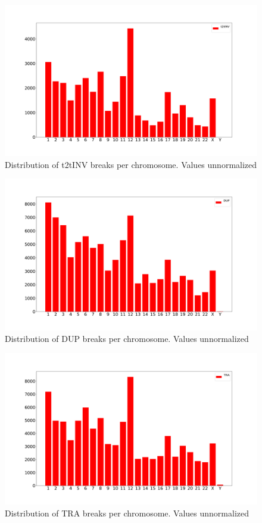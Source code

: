 \documentclass[a4paper,10pt]{article}
\begin{document}
\begin{figure}[H]
\includegraphics[scale=0.2]{figures/t2tINV_Break_distribution_unnormalized.pdf}
\caption{Distribution of t2tINV breaks per chromosome. Values unnormalized}
\end{figure}

\begin{figure}[H]
\includegraphics[scale=0.2]{figures/DUP_Break_distribution_unnormalized.pdf}
\caption{Distribution of DUP breaks per chromosome. Values unnormalized}
\end{figure}

\begin{figure}[H]
\includegraphics[scale=0.2]{figures/TRA_Break_distribution_unnormalized.pdf}
\caption{Distribution of TRA breaks per chromosome. Values unnormalized}
\end{figure}
\end{document}
